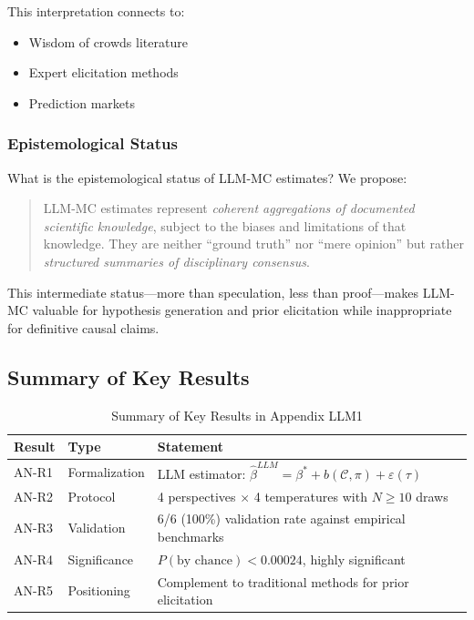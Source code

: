 This interpretation connects to:
\begin{itemize}
    \item Wisdom of crowds literature \citep{surowiecki2005wisdom}
    \item Expert elicitation methods \citep{ohaganelicitation}
    \item Prediction markets \citep{wolfers2004prediction}
\end{itemize}

\subsubsection{Epistemological Status}

What is the epistemological status of LLM-MC estimates? We propose:

\begin{quote}
LLM-MC estimates represent \textit{coherent aggregations of documented scientific knowledge}, subject to the biases and limitations of that knowledge. They are neither ``ground truth'' nor ``mere opinion'' but rather \textit{structured summaries of disciplinary consensus}.
\end{quote}

This intermediate status---more than speculation, less than proof---makes LLM-MC valuable for hypothesis generation and prior elicitation while inappropriate for definitive causal claims.



\subsection{Summary of Key Results}
\label{sec:AN-results}

\begin{table}[htbp]
\centering
\caption{Summary of Key Results in Appendix LLM1}
\label{tab:AN-results}
\renewcommand{\arraystretch}{1.2}
\begin{tabular}{@{}llp{7cm}@{}}
\toprule
\textbf{Result} & \textbf{Type} & \textbf{Statement} \\
\midrule
AN-R1 & Formalization & LLM estimator: $\hat{\beta}^{LLM} = \beta^* + b(\mathcal{C}, \pi) + \varepsilon(\tau)$ \\
AN-R2 & Protocol & 4 perspectives $\times$ 4 temperatures with $N \geq 10$ draws \\
AN-R3 & Validation & 6/6 (100\%) validation rate against empirical benchmarks \\
AN-R4 & Significance & $P(\text{by chance}) < 0.00024$, highly significant \\
AN-R5 & Positioning & Complement to traditional methods for prior elicitation \\
\bottomrule
\end{tabular}
\end{table}

